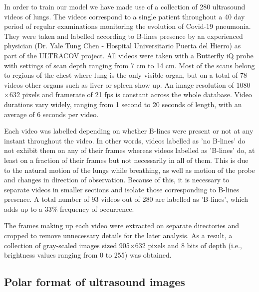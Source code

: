 \documentclass[11pt]{article} %
\begin{document}
	In order to train our model we have made use of a collection of 280 ultrasound videos of lungs. The videos correspond to a single patient throughout a 40 day period of regular examinations monitoring the evolution of Covid-19 pneumonia. They were taken and labelled according to B-lines presence by an experienced physician (Dr. Yale Tung Chen \cite{tung2020lung}
	 - Hospital Universitario Puerta del Hierro) as part of the ULTRACOV project. All videos were taken with a Butterfly iQ probe with settings of scan depth ranging from 7 cm to 14 cm. Most of the scans belong to regions of the chest where lung is the only visible organ, but on a total of 78 videos other organs such as liver or spleen show up. An image resolution of 1080$\times$632 pixels and framerate of 21 fps is constant across the whole database. Video durations vary widely, ranging from 1 second to 20 seconds of length, with an average of 6 seconds per video. 
	
	Each video was labelled depending on whether B-lines were present or not at any instant throughout the video. In other words, videos labelled as 'no B-lines' do not exhibit them on any of their frames whereas videos labelled as 'B-lines' do, at least on a fraction of their frames but not necessarily in all of them. This is due to the natural motion of the lungs while breathing, as well as motion of the probe and changes in direction of observation. Because of this, it is necessary to  separate videos in smaller sections and isolate those corresponding to B-lines presence. A total number of 93 videos out of 280 are labelled as 'B-lines', which adds up to a $33 \%$ frequency of occurrence. 
	
	The frames making up each video were extracted on separate directories and cropped to remove unnecessary details for the later analysis. As a result, a collection of gray-scaled images sized 905$\times$632 pixels and 8 bits of depth (i.e., brightness values ranging from 0 to 255) was obtained.

	 
\subsection{Polar format of ultrasound images}
\end{document}
